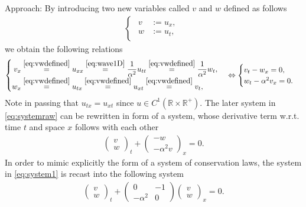\documentclass[12pt]{article}
\begin{document}
Approach: By introducing two new variables called $v$ and $w$ defined as follows
\begin{align}\label{eq:vwdefined}
	\begin{cases}
		\begin{aligned}
			v & := u_{x}, \\
			w & := u_{t},
		\end{aligned}
	\end{cases}
\end{align}
we obtain the following relations
\begin{align}\label{eq:systemraw}
	\begin{cases}
		\begin{aligned}
			v_{x} 
			 & 
			\stackrel{\eqref{eq:vwdefined}}{=} u_{xx}
			\stackrel{\eqref{eq:wave1D}}{=} \frac{1}{\alpha^2} u_{tt}
			\stackrel{\eqref{eq:vwdefined}}{=} \frac{1}{\alpha^2} w_{t}, \\
			w_{x}
			 & 
			\stackrel{\eqref{eq:vwdefined}}{=} u_{tx}
			\stackrel{\eqref{eq:vwdefined}}{=} u_{xt}
			\stackrel{\eqref{eq:vwdefined}}{=} v_{t},
		\end{aligned}
	\end{cases}
	\Leftrightarrow
	\begin{cases}
		v_{t} - w_{x} = 0, \\
		w_{t} - \alpha^2 v_{x} = 0.
	\end{cases}
\end{align}
Note in passing that $u_{tx}=u_{xt}$ since $u\in C^1(\mathbb{R}\times\mathbb{R^+})$.
The later system in \eqref{eq:systemraw} can be rewritten in form of a system, whose derivative term
w.r.t. time $t$ and space $x$ follows with each other
\begin{align}\label{eq:system1}
	\begin{pmatrix} v\\ w\end{pmatrix}_{t}
	+
	\begin{pmatrix} -w \\ -\alpha^2 v \end{pmatrix}_{x}
	= 0.
\end{align}
In order to mimic explicitly the form of a system of conservation laws, the system in \eqref{eq:system1}
is recast into the following system
\begin{align}\label{eq:system2}
	\begin{pmatrix} v\\ w\end{pmatrix}_{t}
	+
	\begin{pmatrix} 0 & -1 \\ -\alpha^2 & 0 \end{pmatrix}
	\begin{pmatrix} v\\ w\end{pmatrix}_{x}
	= 0.
\end{align}
\end{document}
